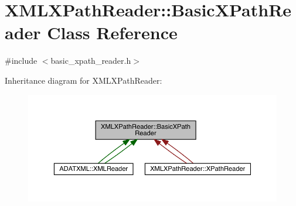 \hypertarget{classXMLXPathReader_1_1BasicXPathReader}{}\section{X\+M\+L\+X\+Path\+Reader\+:\+:Basic\+X\+Path\+Reader Class Reference}
\label{classXMLXPathReader_1_1BasicXPathReader}


{\ttfamily \#include $<$basic\+\_\+xpath\+\_\+reader.\+h$>$}



Inheritance diagram for X\+M\+L\+X\+Path\+Reader\+:\nopagebreak
\begin{figure}[H]
\begin{center}
\leavevmode
\includegraphics[width=350pt]{db/d44/classXMLXPathReader_1_1BasicXPathReader__inherit__graph}
\end{center}
\end{figure}
